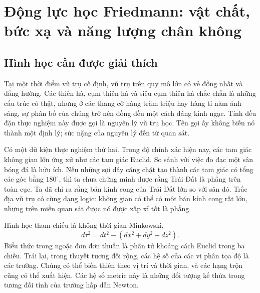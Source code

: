 \chapter{Động lực học Friedmann: vật chất, bức xạ và năng lượng chân không}


\section{Hình học cần được giải thích}

Tại một thời điểm vũ trụ cố định, vũ trụ trên quy mô lớn có vẻ đồng nhất và đẳng hướng. Các thiên hà, cụm thiên hà và siêu cụm thiên hà chắc chắn là những cấu trúc có thật, nhưng ở các thang cỡ hàng trăm triệu hay hàng tỉ năm ánh sáng, sự phân bố của chúng trở nên đồng đều một cách đáng kinh ngạc. Tính đều đặn thực nghiệm này được gọi là nguyên lý vũ trụ học. Tên gọi ấy không biến nó thành một định lý; sức nặng của nguyên lý đến từ quan sát.

Có một dữ kiện thực nghiệm thứ hai. Trong độ chính xác hiện nay, các tam giác không gian lớn ứng xử như các tam giác Euclid. So sánh với việc đo đạc một sân bóng đá là hữu ích. Nếu những sợi dây căng chặt tạo thành các tam giác có tổng các góc bằng \(180^\circ\), thì ta chưa chứng minh được rằng Trái Đất là phẳng trên toàn cục. Ta đã chỉ ra rằng bán kính cong của Trái Đất lớn so với sân đó. Trắc địa vũ trụ có cùng dạng logic: không gian có thể có một bán kính cong rất lớn, nhưng trên miền quan sát được nó được xấp xỉ tốt là phẳng.

Hình học tham chiếu là không-thời gian Minkowski,
\begin{equation}
  d\tau^2=dt^2-\left(dx^2+dy^2+dz^2\right).
  \label{eq:l09-minkowski}
\end{equation}
Biểu thức trong ngoặc đơn đơn thuần là phần tử khoảng cách Euclid trong ba chiều. Trái lại, trong thuyết tương đối rộng, các hệ số của các vi phân tọa độ là các trường. Chúng có thể biến thiên theo vị trí và thời gian, và các hạng trộn cũng có thể xuất hiện. Các hệ số metric này là những đối tượng kế thừa trong tương đối tính của trường hấp dẫn Newton.

